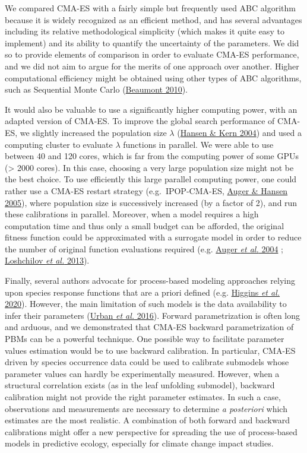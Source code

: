 \documentclass[11pt,]{article}
\begin{document}
We compared CMA-ES with a fairly simple but frequently used ABC
algorithm because it is widely recognized as an efficient method, and
has several advantages including its relative methodological simplicity
(which makes it quite easy to implement) and its ability to quantify the
uncertainty of the parameters. We did so to provide elements of
comparison in order to evaluate CMA-ES performance, and we did not aim
to argue for the merits of one approach over another. Higher
computational efficiency might be obtained using other types of ABC
algorithms, such as Sequential Monte Carlo
(\protect\hyperlink{ref-Beaumont2010}{Beaumont 2010}).

It would also be valuable to use a significantly higher computing power,
with an adapted version of CMA-ES. To improve the global search
performance of CMA-ES, we slightly increased the population size
\(\lambda\) (\protect\hyperlink{ref-Hansen2004}{Hansen \& Kern 2004})
and used a computing cluster to evaluate \(\lambda\) functions in
parallel. We were able to use between 40 and 120 cores, which is far
from the computing power of some GPUs (\textgreater{} 2000 cores). In
this case, choosing a very large population size might not be the best
choice. To use efficiently this large parallel computing power, one
could rather use a CMA-ES restart strategy (e.g.~IPOP-CMA-ES,
\protect\hyperlink{ref-Auger2005}{Auger \& Hansen 2005}), where
population size is successively increased (by a factor of 2), and run
these calibrations in parallel. Moreover, when a model requires a high
computation time and thus only a small budget can be afforded, the
original fitness function could be approximated with a surrogate model
in order to reduce the number of original function evaluations required
(e.g. \protect\hyperlink{ref-Auger2004}{Auger \emph{et al.} 2004} ;
\protect\hyperlink{ref-Loshchilov2013}{Loshchilov \emph{et al.} 2013}).

Finally, several authors advocate for process-based modeling approaches
relying upon species response functions that are a priori defined (e.g.
\protect\hyperlink{ref-Higgins2020}{Higgins \emph{et al.} 2020}).
However, the main limitation of such models is the data availability to
infer their parameters (\protect\hyperlink{ref-Urban2016}{Urban \emph{et
al.} 2016}). Forward parametrization is often long and arduous, and we
demonstrated that CMA-ES backward parametrization of PBMs can be a
powerful technique. One possible way to facilitate parameter values
estimation would be to use backward calibration. In particular, CMA-ES
driven by species occurrence data could be used to calibrate submodels
whose parameter values can hardly be experimentally measured. However,
when a structural correlation exists (as in the leaf unfolding
submodel), backward calibration might not provide the right parameter
estimates. In such a case, observations and measurements are necessary
to determine \emph{a posteriori} which estimates are the most realistic.
A combination of both forward and backward calibrations might offer a
new perspective for spreading the use of process-based models in
predictive ecology, especially for climate change impact studies.
\end{document}

